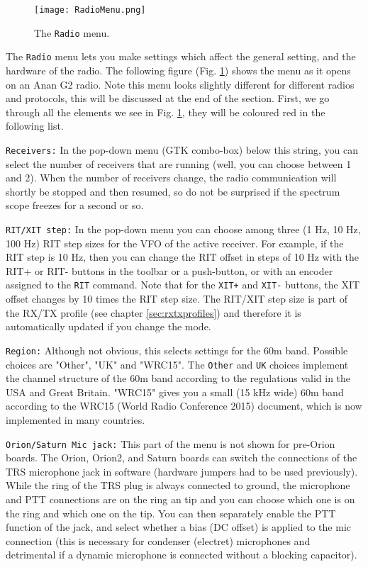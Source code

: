 \documentclass[12pt]{book}
\def\rett#1{\texttt{\color{red}#1}}
\def\bltt#1{\texttt{\color{blue}#1}}
\begin{document}
\begin{figure}[ht]
\center
\texttt{[image: RadioMenu.png]}
\caption{The \bltt{Radio} menu.}
\label{fig:RadioMenu}
\end{figure}


The \bltt{Radio} menu lets you make settings which affect the general setting, and the hardware of the
radio.
The following figure (Fig. \ref{fig:RadioMenu}) shows the menu as it opens on an Anan G2 radio.
Note this menu looks slightly different for different radios and protocols, this will be discussed
at the end of the section. First, we go through all the elements we see in Fig. \ref{fig:RadioMenu},
they will be coloured red in the following list.

\rett{Receivers:} In the pop-down menu (GTK combo-box) below this string, you can select the number
of receivers that are running (well, you can choose between 1 and 2). When the number of receivers change,
the radio communication will shortly be stopped and then resumed, so do not be surprised if the spectrum
scope freezes for a second or so.

\rett{RIT/XIT step:} In the pop-down menu you can choose among three (1 Hz, 10 Hz, 100 Hz) RIT step sizes
for the VFO of the active receiver. For example, if the RIT step is 10 Hz, then you can change the RIT offset
in steps of 10 Hz with the RIT+ or RIT- buttons in the toolbar or a push-button, or with
an encoder assigned to the \bltt{RIT} command. Note that for the
\bltt{XIT+} and \bltt{XIT-} buttons, the XIT offset changes by 10 times the RIT step size. The RIT/XIT step
size is part of the RX/TX profile (see chapter \ref{sec:rxtxprofiles}) and therefore it is automatically updated
if you change the mode.

\rett{Region:} Although not obvious, this selects settings for the 60m band. Possible choices are "Other",
"UK" and "WRC15". The \texttt{Other} and \texttt{UK} choices implement the channel structure of the 60m
band according to the regulations valid in the USA and Great Britain. "WRC15" gives you a small (15 kHz
wide) 60m band according to the WRC15 (World Radio Conference 2015) document, which is now implemented in
many countries.

\rett{Orion/Saturn Mic jack:} This part of the menu is not shown for pre-Orion boards.
The Orion, Orion2, and Saturn boards can switch the connections
of the TRS microphone jack in software (hardware jumpers had to be used previously).
While the ring of the TRS plug is always connected to ground, the microphone and PTT connections are on the
ring an tip and you can choose which one is on the ring and which one on the tip. You can then separately
enable the PTT function of the jack, and select whether a bias (DC offset) is applied to the mic connection
(this is necessary for condenser (electret) microphones and detrimental if a dynamic microphone is connected without
a blocking capacitor).
\end{document}
